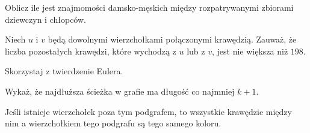 
\begin{hints_list}
	\item *
	\item Oblicz ile jest znajmomości damsko-męskich między rozpatrywanymi zbiorami dziewczyn i chłopców.
	\item Niech $u$ i $v$ będą dowolnymi wierzchołkami połączonymi krawędzią. Zauważ, że liczba pozostałych krawędzi, które wychodzą z $u$ lub z $v$, jest nie większa niż $198$.
	\item Skorzystaj z twierdzenie Eulera.
	\item Wykaż, że najdłuższa ścieżka w grafie ma długość co najmniej $k + 1$.
	\item Jeśli istnieje wierzchołek poza tym podgrafem, to wszystkie krawędzie między nim a wierzchołkiem tego podgrafu są tego samego koloru.
\end{hints_list}